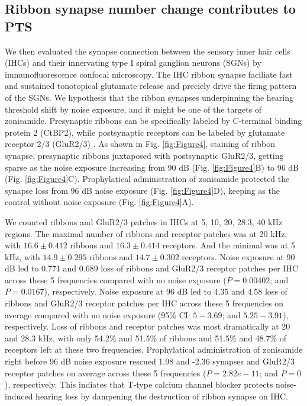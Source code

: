 \documentclass[11pt]{article}
\begin{document}
\subsection {Ribbon synapse number change contributes to PTS}
We then evaluated the synapse connection between the sensory inner hair cells (IHCs) and their innervating type I spiral ganglion neurons (SGNs) by immunofluorescence confocal microscopy. The IHC ribbon synapse faciliate fast and sustained tonotopical glutamate release and preciely drive the firing pattern of the SGNs. We hypothesis that the ribbon synapses underpinning the hearing threshold shift by noise exposure, and it might be one of the targets of zonisamide. Presynaptic ribbons can be specifically labeled by C-terminal binding protein 2 (CtBP2), while postsynaptic receptors can be labeled by glutamate receptor 2/3 (GluR2/3) \cite{Khimich2005,Liberman2011}. As shown in Fig. \ref{fig:Figure4}, staining of ribbon synapse, presynaptic ribbons juxtaposed with postsynaptic GluR2/3, getting sparse as the noise exposure increasing from 90 dB (Fig. \ref{fig:Figure4}B) to 96 dB (Fig. \ref{fig:Figure4}C). Prophylatical administration of zonisamide protected the synapse loss from 96 dB noise exposure (Fig. \ref{fig:Figure4}D), keeping as the control without noise exposure (Fig. \ref{fig:Figure4}A). 

We counted ribbons and GluR2/3 patches in IHCs at 5, 10, 20, 28.3, 40 kHz regions. The maximal number of ribbons and receptor patches was at 20 kHz, with 
$16.6 \pm 
0.412$ ribbons and 
$16.3 \pm 
0.414$ receptors. 
And the minimal was at 5 kHz, with 
$14.9 \pm 
0.295$ ribbons and 
$14.7 \pm 
0.302$ receptors. 
Noise exposure at 90 dB led to 0.771 and 0.689 loss of ribbons and GluR2/3 receptor patches per IHC across these 5 frequencies compared with no noise exposure 
($P=0.00402$; and 
 $P=0.0167$), respectively. Noise exposure at 96 dB led to 4.35 and 4.58 loss of ribbons and GluR2/3 receptor patches per IHC across these 5 frequencies on average compared with no noise exposure 
(95\% CI: $5 - 3.69$; and 
 $5.25 - 3.91$), respectively. Loss of ribbons and receptor patches was most dramatically at 20 and 28.3 kHz, with only 54.2\% and 51.5\% of ribbons and 
 51.5\% and 48.7\% of receptors left at these two frequencies.
 Prophylatical administration of zonisamide right before 96 dB noise exposure rescued 1.98 and -2.36 synapses and GluR2/3 receptor patches on average across these 5 frequencies 
 ($P=2.82e-11$; and 
 $P=0$), respectively. This indiates that T-type calcium channel blocker protects noise-induced hearing loss by dampening the destruction of ribbon synapse on IHC. 
\end{document}
